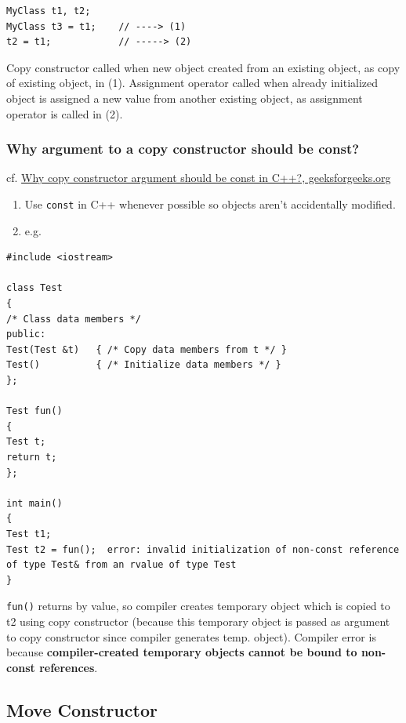 \documentclass[10pt]{amsart}
\begin{document}
\begin{lstlisting}  
MyClass t1, t2; 
MyClass t3 = t1; 	// ----> (1)
t2 = t1; 			// -----> (2)
\end{lstlisting}

Copy constructor called when new object created from an existing object, as copy of existing object, in (1).  
Assignment operator called when already initialized object is assigned a new value from another existing object, as assignment operator is called in (2).  

\subsubsection{Why argument to a copy constructor should be const?  } 

cf. \href{http://www.geeksforgeeks.org/copy-constructor-argument-const/}{Why copy constructor argument should be const in C++?, geeksforgeeks.org}

\begin{enumerate}
	\item Use \verb|const| in C++ whenever possible so objects aren't accidentally modified.  
	\item e.g.  
\end{enumerate}

\begin{lstlisting}  
#include <iostream>  

class Test
{
/* Class data members */
public:
Test(Test &t) 	{ /* Copy data members from t */ } 
Test()			{ /* Initialize data members */ }
};

Test fun() 
{
Test t;
return t;
};

int main()
{
Test t1;
Test t2 = fun();  error: invalid initialization of non-const reference of type Test& from an rvalue of type Test
}
\end{lstlisting}

\verb|fun()| returns by value, so compiler creates temporary object which is copied to t2 using copy constructor (because this temporary object is passed as argument to copy constructor since compiler generates temp. object).  
Compiler error is because \textbf{compiler-created temporary objects cannot be bound to non-const references}. 



\subsection{Move Constructor}  
\end{document}
